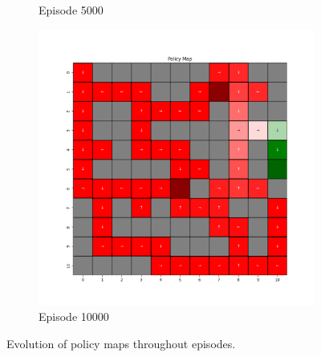 \documentclass{assignment}
\begin{document}
\begin{figure}[H]
\begin{subfigure}{0.3\textwidth}
    \caption{Episode 5000}
    \end{subfigure}\hfill
    \begin{subfigure}{0.3\textwidth}
        \includegraphics[width=\textwidth]{figures/policy_q/gamma_sweep/policy_alpha_0.1_gamma_0.75_epsilon_0.2_iteration_10000.png}
    \caption{Episode 10000}
    \end{subfigure}
    \caption{Evolution of policy maps throughout episodes.}
    \label{fig:gamma_0.75_q_learning_policy}
\end{figure}
\end{document}
